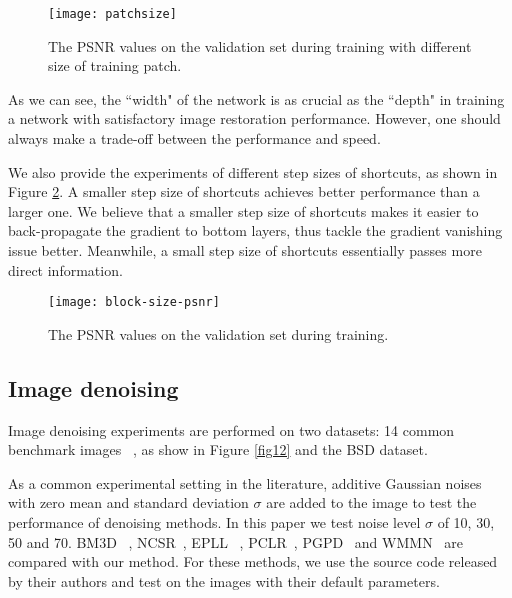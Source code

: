 \begin{figure}[b!]
\centering
\texttt{[image: patchsize]}
\caption{The PSNR values on the validation set during training with different size of training patch.}
\label{fig11}
\end{figure}


As we can see, the ``width" of the network is as crucial as the ``depth" in training
a network with satisfactory image restoration performance. However, one should always make a
trade-off between the performance and speed.

We also provide the experiments of different step sizes of shortcuts, as shown in
Figure \ref{fig7}. A smaller step size of shortcuts achieves better performance than
a larger one. We believe that a smaller step size of shortcuts makes it easier
to back-propagate the gradient to bottom layers, thus tackle the gradient vanishing
issue better. Meanwhile, a small step size of shortcuts essentially passes more direct information.

\begin{figure}[htb!]
\centering
\texttt{[image: block-size-psnr]}
\caption{The PSNR values on the validation set during training.}
\label{fig7}
\end{figure}







\subsection{Image denoising}

Image denoising experiments are performed on two datasets: 14 common benchmark images
~\cite{DBLP:conf/iccv/XuZZZF15,DBLP:conf/iccv/ChenZY15,DBLP:conf/cvpr/LiuXZG15,
DBLP:conf/cvpr/GuZZF14}, as show in Figure \ref{fig12} and the BSD dataset.

As a common
experimental setting in the literature, additive Gaussian noises with zero mean and
standard deviation $\sigma$ are added to the image to test the performance of denoising
methods. In this paper we test noise level $\sigma$ of 10, 30, 50 and 70. BM3D
~\cite{DBLP:journals/tip/DabovFKE07}, NCSR~\cite{DBLP:journals/tip/DongZSL13}, EPLL
~\cite{DBLP:conf/iccv/ZoranW11}, PCLR~\cite{DBLP:conf/iccv/ChenZY15}, PGPD~\cite{DBLP:conf/iccv/XuZZZF15}
and WMMN~\cite{DBLP:conf/cvpr/GuZZF14} are compared with our method. For these methods,
we use the source code released by their authors and test on the images with their default parameters.

